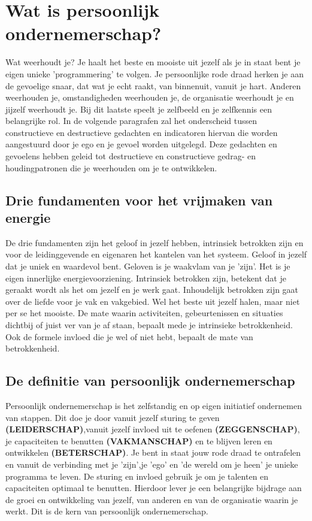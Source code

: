\section{Wat is persoonlijk ondernemerschap?}
Wat weerhoudt je? Je haalt het beste en mooiste uit jezelf als je in staat bent je eigen unieke 'programmering' te volgen. Je persoonlijke rode draad herken je aan de gevoelige snaar, dat wat je echt raakt, van binnenuit, vanuit je hart. Anderen weerhouden je, omstandigheden weerhouden je, de organisatie weerhoudt je en jijzelf weerhoudt je. Bij dit laatste speelt je zelfbeeld en je zelfkennis een belangrijke rol. In de volgende paragrafen zal het onderscheid tussen constructieve en destructieve gedachten en indicatoren hiervan die worden aangestuurd door je ego en je gevoel worden uitgelegd. Deze gedachten en gevoelens hebben geleid tot destructieve en constructieve gedrag- en houdingpatronen die je weerhouden om je te ontwikkelen.
\subsection{Drie fundamenten voor het vrijmaken van energie}
De drie fundamenten zijn het geloof in jezelf hebben, intrinsiek betrokken zijn en voor de leidinggevende en eigenaren het kantelen van het systeem. Geloof in jezelf dat je uniek en waardevol bent. Geloven is je waakvlam van je 'zijn'. Het is je eigen innerlijke energievoorziening. Intrinsiek betrokken zijn, betekent dat je geraakt wordt als het om jezelf en je werk gaat. Inhoudelijk betrokken zijn gaat over de liefde voor je vak en vakgebied. Wel het beste uit jezelf halen, maar niet per se het mooiste. De mate waarin activiteiten, gebeurtenissen en situaties dichtbij of juist ver van je af staan, bepaalt mede je intrinsieke betrokkenheid. Ook de formele invloed die je wel of niet hebt, bepaalt de mate van betrokkenheid.
\subsection{De definitie van persoonlijk ondernemerschap}
Persoonlijk ondernemerschap is het zelfstandig en op eigen initiatief ondernemen van stappen. Dit doe je door vanuit jezelf sturing te geven {\bf(LEIDERSCHAP)},vanuit jezelf invloed uit te oefenen {\bf(ZEGGENSCHAP)}, je capaciteiten te benutten {\bf(VAKMANSCHAP)} en te blijven leren en ontwikkelen {\bf(BETERSCHAP)}. Je bent in staat jouw rode draad te ontrafelen en vanuit de verbinding met je 'zijn',je 'ego' en 'de wereld om je heen' je unieke programma te leven. De sturing en invloed gebruik je om je talenten en capaciteiten optimaal te benutten. Hierdoor lever je een belangrijke bijdrage aan de groei en ontwikkeling van jezelf, van anderen en van de organisatie waarin je werkt. Dit is de kern van persoonlijk ondernemerschap.
